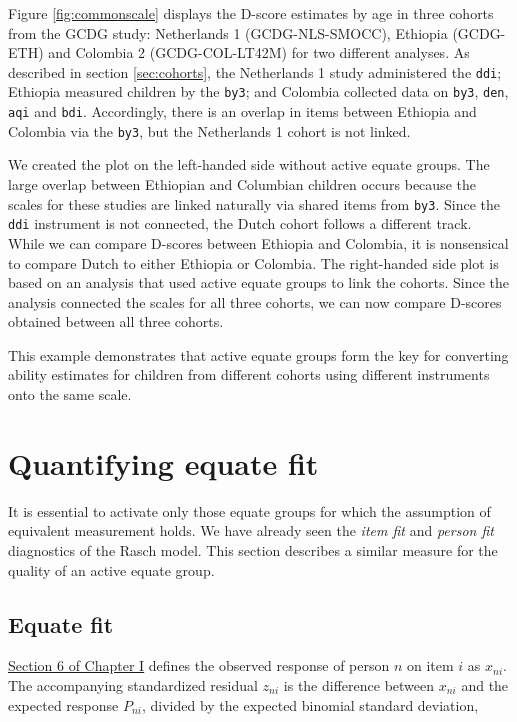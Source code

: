 \documentclass[
]{book}
\begin{document}
Figure \ref{fig:commonscale} displays the D-score estimates by age in three cohorts from the GCDG study: Netherlands 1 (GCDG-NLS-SMOCC), Ethiopia (GCDG-ETH) and Colombia 2 (GCDG-COL-LT42M) for two different analyses. As described in section \ref{sec:cohorts}, the Netherlands 1 study administered the \texttt{ddi}; Ethiopia measured children by the \texttt{by3}; and Colombia collected data on \texttt{by3}, \texttt{den}, \texttt{aqi} and \texttt{bdi}. Accordingly, there is an overlap in items between Ethiopia and Colombia via the \texttt{by3}, but the Netherlands 1 cohort is not linked.

We created the plot on the left-handed side without active equate groups. The large overlap between Ethiopian and Columbian children occurs because the scales for these studies are linked naturally via shared items from \texttt{by3}. Since the \texttt{ddi} instrument is not connected, the Dutch cohort follows a different track. While we can compare D-scores between Ethiopia and Colombia, it is nonsensical to compare Dutch to either Ethiopia or Colombia. The right-handed side plot is based on an analysis that used active equate groups to link the cohorts. Since the analysis connected the scales for all three cohorts, we can now compare D-scores obtained between all three cohorts.

This example demonstrates that active equate groups form the key for converting ability estimates for children from different cohorts using different instruments onto the same scale.

\hypertarget{sec:equatefit}{%
\section{Quantifying equate fit}\label{sec:equatefit}}

It is essential to activate only those equate groups for which the assumption of equivalent measurement holds. We have already seen the \emph{item fit} and \emph{person fit} diagnostics of the Rasch model. This section describes a similar measure for the quality of an active equate group.

\hypertarget{equate-fit}{%
\subsection{Equate fit}\label{equate-fit}}

\href{https://d-score.org/dbook1/ch-evaluation.html}{Section 6 of Chapter I} defines the observed response of person \(n\) on item \(i\) as \(x_{ni}\). The accompanying standardized residual \(z_{ni}\) is the difference between \(x_{ni}\) and the expected response \(P_{ni}\), divided by the expected binomial standard deviation,
\end{document}
